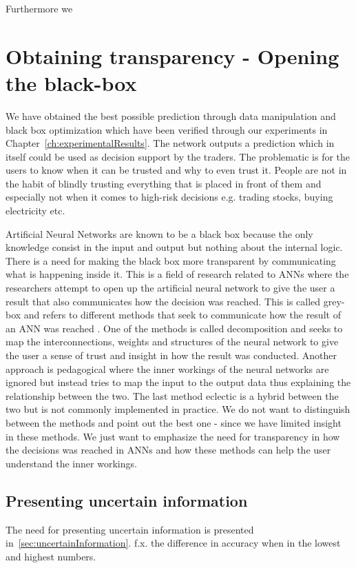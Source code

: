 Furthermore we 


\section{Obtaining transparency - Opening the black-box}
We have obtained the best possible prediction through data manipulation and black box optimization which have been verified through our experiments in Chapter~\ref{ch:experimentalResults}. The network outputs a prediction which in itself could be used as decision support by the traders. The problematic is for the users to know when it can be trusted and why to even trust it. People are not in the habit of blindly trusting everything that is placed in front of them and especially not when it comes to high-risk decisions e.g. trading stocks, buying electricity etc.

Artificial Neural Networks are known to be a black box \cite{fromBlackBoxToTransparentBox} because the only knowledge consist in the input and output but nothing about the internal logic. There is a need for making the black box more transparent by communicating what is happening inside it. This is a field of research related to ANNs where the researchers attempt to open up the artificial neural network to give the user a result that also communicates how the decision was reached. This is called grey-box and refers to different methods that seek to communicate how the result of an ANN was reached \cite{young2010using}. One of the methods is called decomposition and seeks to map the interconnections, weights and structures of the neural network to give the user a sense of trust and insight in how the result was conducted. Another approach is pedagogical where the inner workings of the neural networks are ignored but instead tries to map the input to the output data thus explaining the relationship between the two. The last method eclectic is a hybrid between the two but is not commonly implemented in practice. We do not want to distinguish between the methods and point out the best one - since we have limited insight in these methods. We just want to emphasize the need for transparency in how the decisions was reached in ANNs and how these methods can help the user understand the inner workings.

\subsection{Presenting uncertain information}
The need for presenting uncertain information is presented in~\ref{sec:uncertainInformation}.
f.x. the difference in accuracy when in the lowest and highest numbers.

